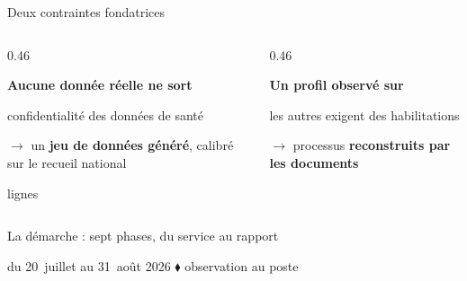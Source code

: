 \documentclass[aspectratio=169,11pt]{beamer}
\begin{document}
\begin{frame}{Deux contraintes fondatrices}
  \vspace{2mm}
  \begin{columns}[T]
    \begin{column}{0.46\textwidth}
      {\large\bfseries\color{accentgarde}Aucune donnée réelle ne sort\par}
      \medskip
      confidentialité des données de santé
      \bigskip

      $\rightarrow$ un \textbf{jeu de données généré}, calibré sur le recueil national
      \bigskip

       lignes\par
    \end{column}
    \begin{column}{0.46\textwidth}
      {\large\bfseries\color{accentgarde}Un profil observé sur \par}
      \medskip
      les autres exigent des habilitations
      \bigskip

      $\rightarrow$  processus \textbf{reconstruits par les documents}
      \bigskip

      \par
    \end{column}
  \end{columns}
\end{frame}

\begin{frame}{La démarche : sept phases, du service au rapport}
  \vspace{1mm}
  \begin{center}
    \resizebox{\textwidth}{!}{}
  \end{center}
  \vspace{2mm}
  \begin{center}
    du 20~juillet au 31~août 2026
    \quad\secondaire{|}\quad
    {\color{accentgarde}$\blacklozenge$} observation au poste\\[1.5mm]
  \end{center}
\end{frame}
\end{document}
